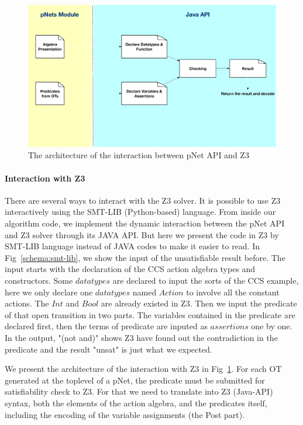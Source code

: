 \documentclass{lncs/llncs}
\newcommand{\TODO}[1]{\textcolor{red}{\textbf{[TODO:#1]}}}
\begin{document}
\begin{figure}[t]
  \includegraphics[width=\linewidth]{XFIG/Interaction}
  \caption{The architecture of the interaction between pNet API and Z3}  \label{schema:interaction}
\end{figure}

\paragraph{Interaction with Z3}
There are several ways to interact with the Z3 solver. 
It is possible to use Z3 interactively using the SMT-LIB
(Python-based) language. From inside our algorithm code, 
we implement the dynamic interaction between the pNet API and Z3
solver through its JAVA API. But here we present the code in Z3 by
SMT-LIB language instead of JAVA codes to make it easier to read. In
Fig~\ref{schema:smt-lib}, we show the  input of the unsatisfiable
result before.
The input starts with the declaration of the CCS action algebra types
and constructors.
Some $datatypes$ are declared to input the sorts of the CCS example, here we only declare one $datatypes$ named $Action$ to involve all the constant actions. The $Int$ and $Bool$ are already existed in Z3. Then we input the predicate of that open transition in two parts. The variables contained in the predicate are declared first, then the terms of predicate are inputed as $assertions$ one by one. In the output, "(not and)" shows Z3 have found out the contradiction in the predicate and the result "unsat" is just what we expected.  



We present the architecture of the interaction with Z3 in
Fig~\ref{schema:interaction}.
For each OT generated at the toplevel of a pNet, the predicate must be
submitted for satisfiability check to Z3. For that we need to
translate into Z3 (Java-API) syntax, both the elements of the action
algebra, and the predicates itself, including the encoding of the
variable assignments (the Post part).
\end{document}
